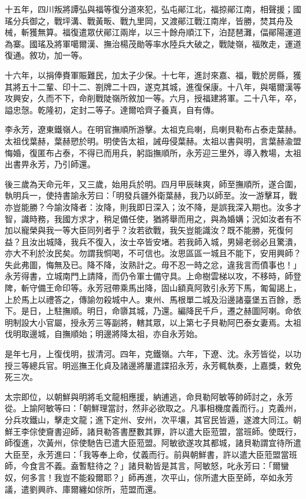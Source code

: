 \begin{pinyinscope}
十五年，四川叛將譚弘與福等復分道來犯，弘屯鄖江北，福掠鄖江南，相聲援；國瑤分兵御之，戰坪溝、戰黃畈、戰九里岡，又渡鄖江戰江南岸，皆勝，焚其舟及械，斬獲無算。福復遣眾伏鄖江兩岸，以三十餘舟順江下，泊琵琶灘，偪鄖陽運道為寨。國瑤及將軍噶爾漢、撫治楊茂勛等率水陸兵大破之，戰陡嶺，福敗走，運道復通。敘功，加一等。

十六年，以捐俸賚軍賑難民，加太子少保。十七年，進討來嘉、福，戰於房縣，獲其將五十二輩、印十二、劄牌二十四，遂克其城，進復保康。十八年，與噶爾漢等攻興安，久而不下，命削戰陡嶺所敘加一等。六月，授福建將軍。二十八年，卒，謚忠愨。乾隆初，定封二等子。達爾哈齊子養真，自有傳。

李永芳，遼東鐵嶺人。在明官撫順所游擊。太祖克烏喇，烏喇貝勒布占泰走葉赫。太祖伐葉赫，葉赫愬於明。明使告太祖，誡毋侵葉赫。太祖以書與明，言葉赫渝盟悔婚，復匿布占泰，不得已而用兵，躬詣撫順所，永芳迎三里外，導入教場，太祖出書畀永芳，乃引師還。

後三歲為天命元年，又三歲，始用兵於明。四月甲辰昧爽，師至撫順所，遂合圍，執明兵一，使持書諭永芳曰：「明發兵疆外衛葉赫，我乃以師至。汝一游擊耳，戰亦豈能勝？今諭汝降者：汝降，則我即日深入；汝不降，是誤我深入期也。汝多才智，識時務，我國方求才，稍足備任使，猶將舉而用之，與為婚媾；況如汝者有不加以寵榮與我一等大臣同列者乎？汝若欲戰，我矢豈能識汝？既不能勝，死復何益？且汝出城降，我兵不復入，汝士卒皆安堵。若我師入城，男婦老弱必且驚潰，亦大不利於汝民矣。勿謂我恫喝，不可信也。汝思區區一城且不能下，安用興師？失此弗圖，悔無及已。降不降，汝熟計之。毋不忍一時之忿，違我言而僨事也！」永芳得書，立城南門上請降，而仍令軍士備守具。上命樹雲梯以攻，不移時，師登陴，斬守備王命印等。永芳冠帶乘馬出降，固山額真阿敦引永芳下馬，匍匐謁上，上於馬上以禮答之，傳諭勿殺城中人。東州、馬根單二城及沿邊諸臺堡五百餘，悉下。是日，上駐撫順。明日，命隳其城，乃還。編降民千戶，遷之赫圖阿喇。命依明制設大小官屬，授永芳三等副將，轄其眾，以上第七子貝勒阿巴泰女妻焉。太祖伐明取邊城，自撫順始；明邊將降太祖，亦自永芳始。

是年七月，上復伐明，拔清河。四年，克鐵嶺。六年，下遼、沈。永芳皆從，以功授三等總兵官。明巡撫王化貞及諸邊將屢遣諜招永芳，永芳輒執奏，上嘉獎，敕免死三次。

太宗即位，以朝鮮與明將毛文龍相應援，納逋逃，命貝勒阿敏等帥師討之，永芳從。上諭阿敏等曰：「朝鮮理當討，然非必欲取之。凡事相機度義而行。」克義州，分兵攻鐵山，擊走文龍；進下定州、安州，次平壤，其官民皆遁，遂渡大同江。朝鮮王李倧使齎書迎師，諸貝勒答書歷數其罪，許以遣大臣蒞盟，當班師。使既行，師復進，次黃州，倧使馳告已遣大臣蒞盟。阿敏欲遂攻其都城，諸貝勒謂宜待所遣大臣至，永芳進曰：「我等奉上命，仗義而行。前與朝鮮書，許以遣大臣蒞盟當班師，今食言不義。盍暫駐待之？」諸貝勒皆是其言，阿敏怒，叱永芳曰：「爾蠻奴，何多言！我豈不能殺爾耶？」師再進，次平山，倧所遣大臣至師，卒如永芳議，遣劉興祚、庫爾纏如倧所，蒞盟而還。


\end{pinyinscope}
